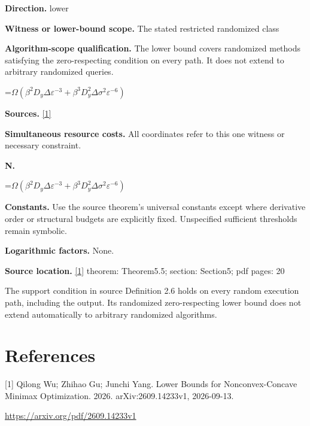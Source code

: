 \documentclass[10pt,a4paper]{article}
\newcommand{\AtlasMath}[1]{\par\begingroup\centering\setbox0=\hbox{$\displaystyle #1$}\ifdim\wd0>1.4\linewidth\typeout{ATLAS WIDE FORMULA: \the\wd0}\fi\ifdim\wd0>\linewidth\resizebox{\linewidth}{!}{\box0}\else\box0\fi\par\endgroup}
\begin{document}
\textbf{Direction.} lower

\textbf{Witness or lower-bound scope.} The stated restricted randomized class

\textbf{Algorithm-scope qualification.} The lower bound covers randomized methods satisfying the zero-respecting condition on every path. It does not extend to arbitrary randomized queries.

\AtlasMath{\Omega(\beta^2D_y\Delta\varepsilon^{-3}+\beta^3D_y^2\Delta\sigma^2\varepsilon^{-6})}
\textbf{Sources.} \href{https://arxiv.org/pdf/2609.14233v1}{[1]}

\textbf{Simultaneous resource costs.} All coordinates refer to this one witness or necessary constraint.

\textbf{N.}

\AtlasMath{\Omega(\beta^2D_y\Delta\varepsilon^{-3}+\beta^3D_y^2\Delta\sigma^2\varepsilon^{-6})}
\textbf{Constants.} Use the source theorem’s universal constants except where derivative order or structural budgets are explicitly fixed. Unspecified sufficient thresholds remain symbolic.

\textbf{Logarithmic factors.} None.

\textbf{Source location.} \href{https://arxiv.org/pdf/2609.14233v1}{[1]} theorem: Theorem5.5; section: Section5; pdf pages: 20

The support condition in source Definition 2.6 holds on every random execution path, including the output. Its randomized zero-respecting lower bound does not extend automatically to arbitrary randomized algorithms.

\section{References}
[1] Qilong Wu; Zhihao Gu; Junchi Yang. Lower Bounds for Nonconvex-Concave Minimax Optimization. 2026. arXiv:2609.14233v1, 2026-09-13.

\url{https://arxiv.org/pdf/2609.14233v1}
\end{document}
